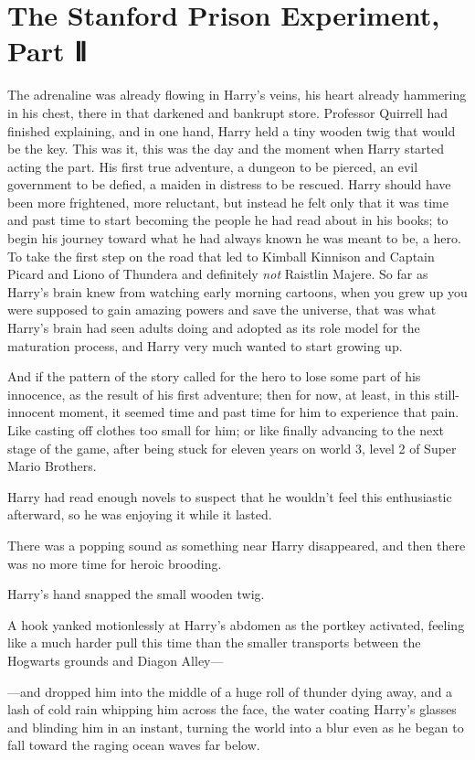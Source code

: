 \chapter{The Stanford Prison Experiment, Part Ⅱ}

The adrenaline was already flowing in Harry's veins, his heart already
hammering in his chest, there in that darkened and bankrupt store.
Professor Quirrell had finished explaining, and in one hand, Harry held
a tiny wooden twig that would be the key. This was it, this was the day
and the moment when Harry started acting the part. His first true
adventure, a dungeon to be pierced, an evil government to be defied, a
maiden in distress to be rescued. Harry should have been more
frightened, more reluctant, but instead he felt only that it was time
and past time to start becoming the people he had read about in his
books; to begin his journey toward what he had always known he was meant
to be, a hero. To take the first step on the road that led to Kimball
Kinnison and Captain Picard and Liono of Thundera and definitely
\emph{not} Raistlin Majere. So far as Harry's brain knew from watching
early morning cartoons, when you grew up you were supposed to gain
amazing powers and save the universe, that was what Harry's brain had
seen adults doing and adopted as its role model for the maturation
process, and Harry very much wanted to start growing up.

And if the pattern of the story called for the hero to lose some part of
his innocence, as the result of his first adventure; then for now, at
least, in this still-innocent moment, it seemed time and past time for
him to experience that pain. Like casting off clothes too small for him;
or like finally advancing to the next stage of the game, after being
stuck for eleven years on world 3, level 2 of Super Mario Brothers.

Harry had read enough novels to suspect that he wouldn't feel this
enthusiastic afterward, so he was enjoying it while it lasted.

There was a popping sound as something near Harry disappeared, and then
there was no more time for heroic brooding.

Harry's hand snapped the small wooden twig.

A hook yanked motionlessly at Harry's abdomen as the portkey activated,
feeling like a much harder pull this time than the smaller transports
between the Hogwarts grounds and Diagon Alley---

---and dropped him into the middle of a huge roll of thunder dying away,
and a lash of cold rain whipping him across the face, the water coating
Harry's glasses and blinding him in an instant, turning the world into a
blur even as he began to fall toward the raging ocean waves far below.

